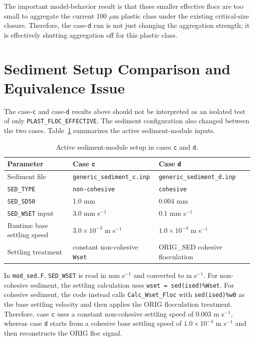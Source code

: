 \documentclass[11pt]{article}
\begin{document}
The important model-behavior result is that these smaller effective flocs are
too small to aggregate the current 100 $\mu$m plastic class under the existing
critical-size closure.  Therefore, the case-\texttt{d} run is not just changing
the aggregation strength; it is effectively shutting aggregation off for this
plastic class.

\section*{Sediment Setup Comparison and Equivalence Issue}

The case-\texttt{c} and case-\texttt{d} results above should not be interpreted
as an isolated test of only \texttt{PLAST\_FLOC\_EFFECTIVE}.  The sediment
configuration also changed between the two cases.  Table~\ref{tab:sedsetup}
summarizes the active sediment-module inputs.

\begin{table}[h]
\centering
\caption{Active sediment-module setup in cases \texttt{c} and \texttt{d}.}
\label{tab:sedsetup}
\begin{tabular}{lll}
\toprule
Parameter & Case \texttt{c} & Case \texttt{d} \\
\midrule
Sediment file &
\texttt{generic\_sediment\_c.inp} &
\texttt{generic\_sediment\_d.inp} \\
\texttt{SED\_TYPE} &
\texttt{non-cohesive} &
\texttt{cohesive} \\
\texttt{SED\_SD50} &
1.0 mm &
0.004 mm \\
\texttt{SED\_WSET} input &
3.0 mm s$^{-1}$ &
0.1 mm s$^{-1}$ \\
Runtime base settling speed &
$3.0\times10^{-3}$ m s$^{-1}$ &
$1.0\times10^{-4}$ m s$^{-1}$ \\
Settling treatment &
constant non-cohesive \texttt{Wset} &
ORIG\_SED cohesive flocculation \\
\bottomrule
\end{tabular}
\end{table}

In \texttt{mod\_sed.F}, \texttt{SED\_WSET} is read in mm s$^{-1}$ and converted
to m s$^{-1}$.  For non-cohesive sediment, the settling calculation uses
\texttt{wset = sed(ised)\%Wset}.  For cohesive sediment, the code instead calls
\texttt{Calc\_Wset\_Floc} with \texttt{sed(ised)\%w0} as the base settling
velocity and then applies the ORIG flocculation treatment.  Therefore, case
\texttt{c} uses a constant non-cohesive settling speed of 0.003 m s$^{-1}$,
whereas case \texttt{d} starts from a cohesive base settling speed of
$1.0\times10^{-4}$ m s$^{-1}$ and then reconstructs the ORIG floc signal.
\end{document}
